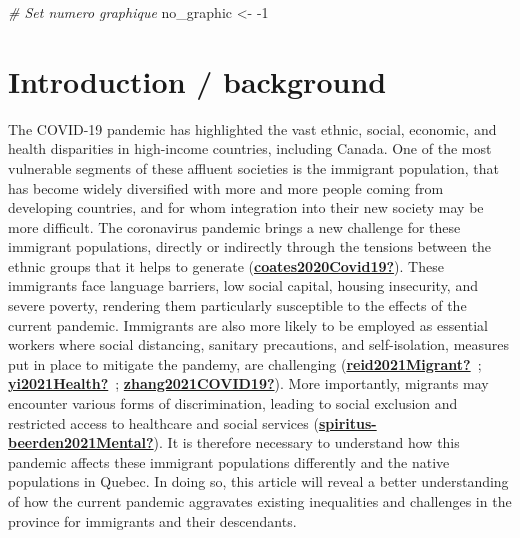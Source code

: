 \documentclass[
]{article}
\newenvironment{Shaded}{\begin{snugshade}}{\end{snugshade}}
\newcommand{\CommentTok}[1]{\textcolor[rgb]{0.56,0.35,0.01}{\textit{#1}}}
\newcommand{\DecValTok}[1]{\textcolor[rgb]{0.00,0.00,0.81}{#1}}
\newcommand{\NormalTok}[1]{#1}
\newcommand{\OtherTok}[1]{\textcolor[rgb]{0.56,0.35,0.01}{#1}}
\newcommand{\SpecialCharTok}[1]{\textcolor[rgb]{0.00,0.00,0.00}{#1}}
\begin{document}
\begin{Shaded}
\begin{Highlighting}[]
\CommentTok{\# Set numero graphique}
\NormalTok{no\_graphic }\OtherTok{\textless{}{-}} \SpecialCharTok{{-}}\DecValTok{1}
\end{Highlighting}
\end{Shaded}

\hypertarget{introduction-background-1}{%
\section{Introduction / background}\label{introduction-background-1}}

The COVID-19 pandemic has highlighted the vast ethnic, social, economic, and
health disparities in high-income countries, including Canada. One of the most
vulnerable segments of these affluent societies is the immigrant population,
that has become widely diversified with more and more people coming from
developing countries, and for whom integration into their new society may be
more difficult. The coronavirus pandemic brings a new challenge for these
immigrant populations, directly or indirectly through the tensions between the
ethnic groups that it helps to generate (\protect\hyperlink{ref-coates2020Covid19}{\textbf{coates2020Covid19?}}). These immigrants
face language barriers, low social capital, housing insecurity, and severe
poverty, rendering them particularly susceptible to the effects of the current
pandemic. Immigrants are also more likely to be employed as essential workers
where social distancing, sanitary precautions, and self-isolation, measures put
in place to mitigate the pandemy, are challenging (\protect\hyperlink{ref-reid2021Migrant}{\textbf{reid2021Migrant?}}~; \protect\hyperlink{ref-yi2021Health}{\textbf{yi2021Health?}}~; \protect\hyperlink{ref-zhang2021COVID19}{\textbf{zhang2021COVID19?}}). More importantly, migrants may encounter
various forms of discrimination, leading to social exclusion and restricted
access to healthcare and social services (\protect\hyperlink{ref-spiritus-beerden2021Mental}{\textbf{spiritus-beerden2021Mental?}}). It is
therefore necessary to understand how this pandemic affects these immigrant
populations differently and the native populations in Quebec. In doing so, this
article will reveal a better understanding of how the current pandemic
aggravates existing inequalities and challenges in the province for immigrants
and their descendants.
\end{document}
